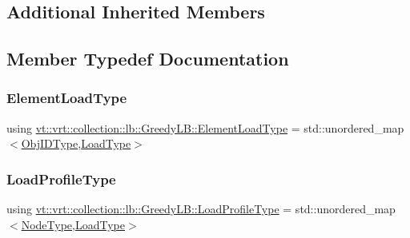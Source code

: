 \subsection*{Additional Inherited Members}


\subsection{Member Typedef Documentation}
\mbox{\label{structvt_1_1vrt_1_1collection_1_1lb_1_1_greedy_l_b_aa499b608b1f72276dea47b7aa6ee38ff}} 
\subsubsection{\texorpdfstring{Element\+Load\+Type}{ElementLoadType}}
{\footnotesize\ttfamily using \hyperlink{structvt_1_1vrt_1_1collection_1_1lb_1_1_greedy_l_b_aa499b608b1f72276dea47b7aa6ee38ff}{vt\+::vrt\+::collection\+::lb\+::\+Greedy\+L\+B\+::\+Element\+Load\+Type} =  std\+::unordered\+\_\+map$<$\hyperlink{structvt_1_1vrt_1_1collection_1_1lb_1_1_base_l_b_a790b22acf448880599724749cdc4e9b3}{Obj\+I\+D\+Type},\hyperlink{namespacevt_a8fb51741340b87d7aaee0bef60e9896b}{Load\+Type}$>$}

\mbox{\label{structvt_1_1vrt_1_1collection_1_1lb_1_1_greedy_l_b_a3db2c9b36ac99ed4aed38519be4aad60}} 
\subsubsection{\texorpdfstring{Load\+Profile\+Type}{LoadProfileType}}
{\footnotesize\ttfamily using \hyperlink{structvt_1_1vrt_1_1collection_1_1lb_1_1_greedy_l_b_a3db2c9b36ac99ed4aed38519be4aad60}{vt\+::vrt\+::collection\+::lb\+::\+Greedy\+L\+B\+::\+Load\+Profile\+Type} =  std\+::unordered\+\_\+map$<$\hyperlink{namespacevt_a866da9d0efc19c0a1ce79e9e492f47e2}{Node\+Type},\hyperlink{namespacevt_a8fb51741340b87d7aaee0bef60e9896b}{Load\+Type}$>$}

